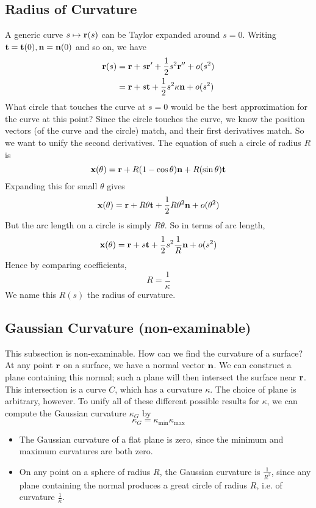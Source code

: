 \documentclass{article}
\begin{document}
\subsection{Radius of Curvature}
A generic curve $s \mapsto \vb r(s)$ can be Taylor expanded around $s=0$. Writing $\vb t = \vb t(0), \vb n = \vb n(0)$ and so on, we have
\begin{align*}
	\vb r(s) & = \vb r + s\vb r' + \frac{1}{2}s^2 \vb r'' + o(s^2)    \\
	         & = \vb r + s\vb t + \frac{1}{2}s^2 \kappa\vb n + o(s^2)
\end{align*}
What circle that touches the curve at $s=0$ would be the best approximation for the curve at this point? Since the circle touches the curve, we know the position vectors (of the curve and the circle) match, and their first derivatives match. So we want to unify the second derivatives. The equation of such a circle of radius $R$ is
\[ \vb x(\theta) = \vb r + R(1 - \cos \theta)\vb n + R(\sin \theta) \vb t \]
Expanding this for small $\theta$ gives
\[ \vb x(\theta) = \vb r + R\theta\vb t + \frac{1}{2} R\theta^2\vb n + o(\theta^2) \]
But the arc length on a circle is simply $R\theta$. So in terms of arc length,
\[ \vb x(\theta) = \vb r + s\vb t + \frac{1}{2} s^2 \frac{1}{R}\vb n + o(s^2) \]
Hence by comparing coefficients,
\[ R = \frac{1}{\kappa} \]
We name this $R(s)$ the radius of curvature.

\subsection{Gaussian Curvature (non-examinable)}
This subsection is non-examinable. How can we find the curvature of a surface? At any point $\vb r$ on a surface, we have a normal vector $\vb n$. We can construct a plane containing this normal; such a plane will then intersect the surface near $\vb r$. This intersection is a curve $C$, which has a curvature $\kappa$. The choice of plane is arbitrary, however. To unify all of these different possible results for $\kappa$, we can compute the Gaussian curvature $\kappa_G$ by
\[ \kappa_G = \kappa_{\text{min}} \kappa_{\text{max}} \]
\begin{itemize}
	\item The Gaussian curvature of a flat plane is zero, since the minimum and maximum curvatures are both zero.
	\item On any point on a sphere of radius $R$, the Gaussian curvature is $\frac{1}{R^2}$, since any plane containing the normal produces a great circle of radius $R$, i.e. of curvature $\frac{1}{\kappa}$.
\end{itemize}
\end{document}
